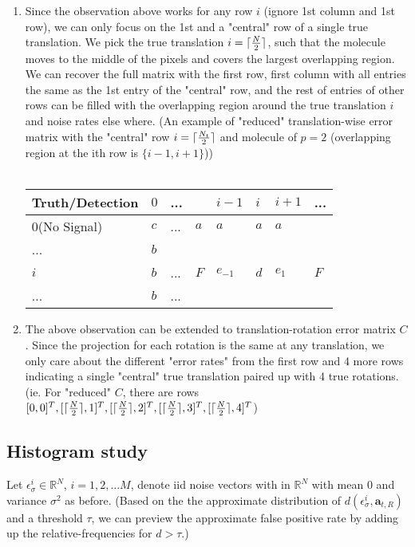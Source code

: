 \documentclass[11pt]{article}
\DeclarePairedDelimiter{\ceil}{\lceil}{\rceil}
\newcommand{\ba}{\boldsymbol{a}}
\begin{document}
\begin{enumerate}
            \item Since the observation above works for any row $i$ (ignore 1st column and 1st row), we can only focus on the 1st and a "central" row of a single true translation. We pick the true translation $i=\ceil{\frac{N}{2}}$, such that the molecule moves to the middle of the pixels and covers the largest overlapping region. We can recover the full matrix with the first row, first column with all entries the same as the 1st entry of the "central" row, and the rest of entries of other rows can be filled with the overlapping region around the true translation $i$ and noise rates else where. (An example of "reduced" translation-wise error matrix with the "central" row $i=\ceil{\frac{N_t}{2}}$ and molecule of $p=2$ (overlapping region at the ith row is $\{i-1,i+1\}$))
            \\\\
            \begin{tabular}{l|l|l|l|l|l|l|l}
            Truth/Detection&$0$&...& &$i-1$&$i$&$i+1$&...\\\hline
            $0$(No Signal)&$c$&... &$a$&$a$&$a$&$a$& \\\hline
            ...&$b$& & & & & & \\\hline
            $i$&$b$&...&$F$ &$e_{-1}$&$d$&$e_{1}$&$F$\\\hline
            ...&$b$&...& & & & & \\\hline
            
            \end{tabular}
            
            \item The above observation can be extended to translation-rotation error matrix $C$. Since the projection for each rotation is the same at any translation, we only care about the different "error rates" from the first row and 4 more rows indicating a single "central" true translation paired up with 4 true rotations. \\ (ie. For "reduced" $C$, there are rows $[0, 0]^T, [\ceil{\frac{N}{2}}, 1]^T, [\ceil{\frac{N}{2}}, 2]^T, [\ceil{\frac{N}{2}}, 3]^T, [\ceil{\frac{N}{2}}, 4]^T$)
            
        \end{enumerate}
        

\subsection{Histogram study}
Let $\epsilon_{\sigma}^{i}  \in \mathbb{R}^{N}$, $i=1,2,\ldots M$, denote iid noise vectors with in $\mathbb{R}^{N}$ with mean $0$ and variance $\sigma^2$ as before. (Based on the the approximate distribution of $d(\epsilon_{\sigma}^i, \ba_{t,R})$ and a threshold $\tau$, we can preview the approximate false positive rate by adding up the relative-frequencies for $d>\tau$.)
\end{document}
